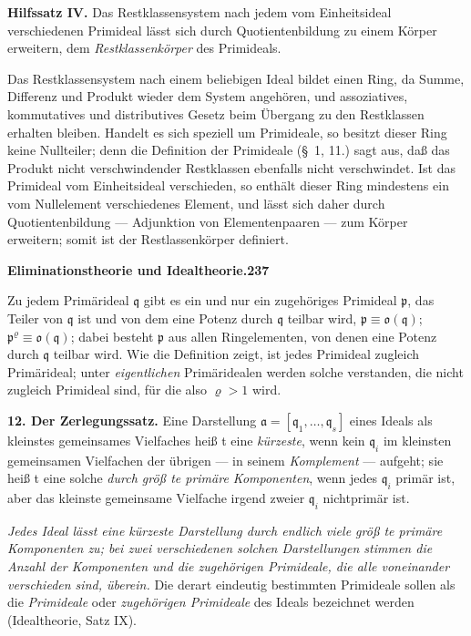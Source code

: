\documentclass[12pt,a4paper]{article}
\begin{document}
{{\textbf{Hilfssatz IV.} Das Restklassensystem nach jedem vom Einheitsideal
verschiedenen Primideal l\"{a}sst sich durch Quotientenbildung zu einem
K\"{o}rper erweitern, dem \textit{Restklassenk\"{o}rper} des Primideals.

Das Restklassensystem nach einem beliebigen Ideal bildet einen Ring,
da Summe, Differenz und Produkt wieder dem System angeh\"{o}ren, und
assoziatives, kommutatives und distributives Gesetz beim \"{U}bergang zu
den Restklassen erhalten bleiben. Handelt es sich speziell um Primideale,
so besitzt dieser Ring keine Nullteiler; denn die Definition der Primideale
(\S~1, 11.) sagt aus, da{\ss} das Produkt nicht verschwindender Restklassen
ebenfalls nicht verschwindet. Ist das Primideal vom Einheitsideal
verschieden, so enth\"{a}lt dieser Ring mindestens ein vom Nullelement verschiedenes
Element, und l\"{a}sst sich daher durch Quotientenbildung ---
Adjunktion von Elementenpaaren --- zum K\"{o}rper erweitern; somit ist
der Restlassenk\"{o}rper definiert.

\newpage
\begin{center}
\textbf{Eliminationstheorie und Idealtheorie.}\quad\textbf{237}
\end{center}

Zu jedem Prim\"{a}rideal $\mathfrak{q}$ gibt es ein und nur ein zugeh\"{o}riges Primideal $\mathfrak{p}$,
das Teiler von $\mathfrak{q}$ ist und von dem eine Potenz durch $\mathfrak{q}$ teilbar wird,
$\mathfrak{p}\equiv\mathfrak{o}(\mathfrak{q})$; $\mathfrak{p}^{\varrho}\equiv\mathfrak{o}(\mathfrak{q})$; dabei besteht $\mathfrak{p}$ aus allen Ringelementen, von denen
eine Potenz durch $\mathfrak{q}$ teilbar wird. Wie die Definition zeigt, ist jedes Primideal
zugleich Prim\"{a}rideal; unter \textit{eigentlichen} Prim\"{a}ridealen werden solche
verstanden, die nicht zugleich Primideal sind, f\"{u}r die also $\varrho>1$ wird.

\textbf{12. Der Zerlegungssatz.} Eine Darstellung $\mathfrak{a}=[\mathfrak{q}_{1},\dots,\mathfrak{q}_{s}]$ eines
Ideals als kleinstes gemeinsames Vielfaches hei{\ss} t eine \textit{k\"{u}rzeste}, wenn kein $\mathfrak{q}_{i}$
im kleinsten gemeinsamen Vielfachen der \"{u}brigen --- in seinem \textit{Komplement}
--- aufgeht; sie hei{\ss} t eine solche \textit{durch gr\"{o}{\ss} te prim\"{a}re Komponenten},
 wenn jedes $\mathfrak{q}_{i}$ prim\"{a}r ist, aber das kleinste gemeinsame Vielfache irgend
zweier $\mathfrak{q}_{i}$ nichtprim\"{a}r ist.

\textit{Jedes Ideal l\"{a}sst eine k\"{u}rzeste Darstellung durch endlich viele gr\"{o}{\ss} te prim\"{a}re
Komponenten zu; bei zwei verschiedenen solchen Darstellungen stimmen
die Anzahl der Komponenten und die zugeh\"{o}rigen Primideale, die alle
voneinander verschieden sind, \"{u}berein.} Die derart eindeutig bestimmten
Primideale sollen als die \textit{Primideale} oder \textit{zugeh\"{o}rigen Primideale}
des Ideals bezeichnet werden (Idealtheorie, Satz IX).

}}
\end{document}
